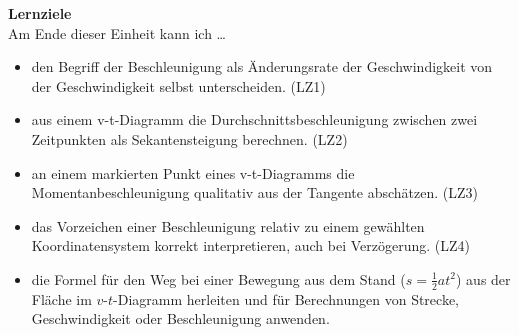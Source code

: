 \documentclass[addpoints,11pt,a4paper]{exam}
\newenvironment{infobox}{%
  \par\addvspace{10pt}\noindent
}{%
  \par\addvspace{10pt}
}
\begin{document}
\begin{infobox}
\textbf{Lernziele}\\
Am Ende dieser Einheit kann ich \dots
\begin{itemize}[leftmargin=1.2cm,itemsep=0.25em]
  \item den Begriff der Beschleunigung als Änderungsrate der Geschwindigkeit von der Geschwindigkeit selbst unterscheiden. (LZ1)
  \item aus einem v-t-Diagramm die Durchschnittsbeschleunigung zwischen zwei Zeitpunkten als Sekantensteigung berechnen. (LZ2)
  \item an einem markierten Punkt eines v-t-Diagramms die Momentanbeschleunigung qualitativ aus der Tangente abschätzen. (LZ3)
  \item das Vorzeichen einer Beschleunigung relativ zu einem gewählten Koordinatensystem korrekt interpretieren, auch bei Verzögerung. (LZ4)
  \item die Formel für den Weg bei einer Bewegung aus dem Stand ($s=\tfrac12at^2$) aus der Fläche im $v$-$t$-Diagramm herleiten und für Berechnungen von Strecke, Geschwindigkeit oder Beschleunigung anwenden.
\end{itemize}
\end{infobox}
\end{document}
